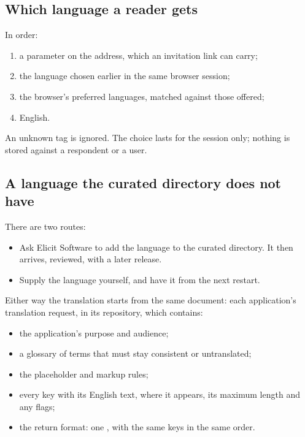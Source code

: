 \documentclass[11pt, a4paper]{article}
\begin{document}
\subsection{Which language a reader gets}

In order:
\begin{enumerate}
  \item a  parameter on the address, which an invitation link can carry;
  \item the language chosen earlier in the same browser session;
  \item the browser's preferred languages, matched against those offered;
  \item English.
\end{enumerate}
An unknown tag is ignored. The choice lasts for the session only; nothing is stored against a
respondent or a user.

\subsection{A language the curated directory does not have}
\label{sec:commission}

There are two routes:
\begin{itemize}
  \item Ask Elicit Software to add the language to the curated directory. It then arrives,
        reviewed, with a later release.
  \item Supply the language yourself, and have it from the next restart.
\end{itemize}
Either way the translation starts from the same document: each application's translation
request,  in its repository, which contains:
\begin{itemize}
  \item the application's purpose and audience;
  \item a glossary of terms that must stay consistent or untranslated;
  \item the placeholder and markup rules;
  \item every key with its English text, where it appears, its maximum length and any flags;
  \item the return format: one , with the same keys in the
        same order.
\end{itemize}
\end{document}
